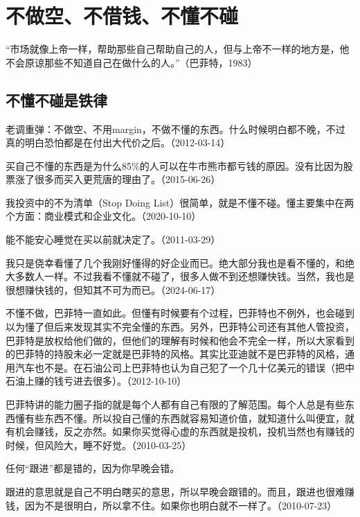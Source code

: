 
\section{不做空、不借钱、不懂不碰}

“市场就像上帝一样，帮助那些自己帮助自己的人，但与上帝不一样的地方是，他不会原谅那些不知道自己在做什么的人。”（巴菲特，1983）

\subsection{不懂不碰是铁律}

老调重弹：不做空、不用margin，不做不懂的东西。什么时候明白都不晚，不过真的明白恐怕都是在付出大代价之后。（2012-03-14）

买自己不懂的东西是为什么85\%的人可以在牛市熊市都亏钱的原因。没有比因为股票涨了很多而买入更荒唐的理由了。（2015-06-26）

我投资中的不为清单（Stop Doing List）很简单，就是不懂不碰。懂主要集中在两个方面：商业模式和企业文化。（2020-10-10）


能不能安心睡觉在买以前就决定了。（2011-03-29）

我只是侥幸看懂了几个我刚好懂得的好企业而已。绝大部分我也是看不懂的，和绝大多数人一样。不过我看不懂就不碰了，很多人做不到还想赚快钱。当然，我也是很想赚快钱的，但知其不可为而已。（2024-06-17）

不懂不做，巴菲特一直如此。但懂有时候要有个过程，巴菲特也不例外，也会碰到以为懂了但后来发现其实不完全懂的东西。另外，巴菲特公司还有其他人管投资，巴菲特是放权给他们做的，但他们的理解有时候和他会不完全一样，所以大家看到的巴菲特的持股未必一定就是巴菲特的风格。其实比亚迪就不是巴菲特的风格，通用汽车也不是。在石油公司上巴菲特也认为自己犯了一个几十亿美元的错误（把中石油上赚的钱亏进去很多）。（2012-10-10）

巴菲特讲的能力圈子指的就是每个人都有自己有限的了解范围。每个人总是有些东西懂有些东西不懂。所以投自己懂的东西就容易知道价值，就知道什么叫便宜，就有机会赚钱，反之亦然。如果你买觉得心虚的东西就是投机，投机当然也有赚钱的时候，但风险大，睡不好觉。（2010-03-25）


任何“跟进”都是错的，因为你早晚会错。

跟进的意思就是自己不明白瞎买的意思，所以早晚会跟错的。而且，跟进也很难赚钱，因为不是很明白，所以拿不住。如果你也明白就不一样了。（2010-07-23）


